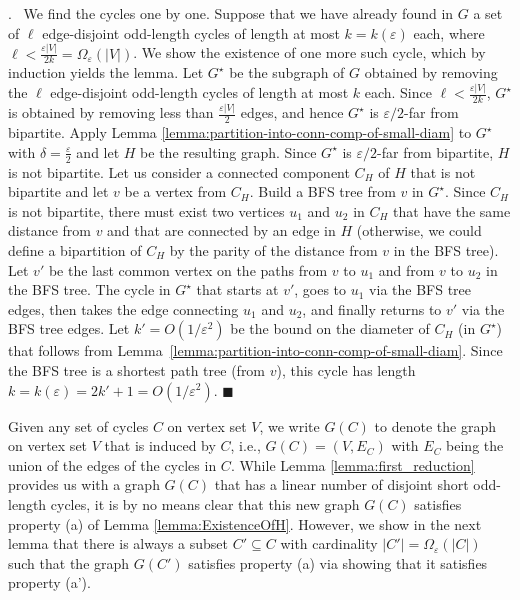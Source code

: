 \documentclass[11pt]{article}
\newenvironment{proof}{\noindent {\bf Proof}.\ }{\qed \par\vskip 4mm\par}
\newcommand{\sq}{\hbox{\rlap{$\sqcap$}$\sqcup$}}
\newcommand{\qed}{\hspace*{\fill}\sq}
\renewcommand{\qed}{\hspace*{\fill}\ensuremath{\blacksquare}}
\newcommand{\eps}{\ensuremath{\epsilon}}
\def\epsilon{\ensuremath{\varepsilon}}
\begin{document}
\begin{proof}
We find the cycles one by one. Suppose that we have already found in $G$ a set of $\ell$ edge-disjoint odd-length cycles of length at most $k=k(\eps)$ each, where $\ell < \frac{\eps |V|}{2k}=\Omega_{\eps}(|V|)$. We show the existence of one more such cycle, which by induction yields the lemma. Let $G^\star$ be the subgraph of $G$ obtained by removing the $\ell$ edge-disjoint odd-length cycles of length at most $k$ each. Since $\ell < \frac{\eps |V|}{2k}$, $G^\star$ is obtained by removing less than $\frac{\eps |V|}{2}$ edges, and hence $G^\star$ is $\eps/2$-far from bipartite. Apply Lemma \ref{lemma:partition-into-conn-comp-of-small-diam} to $G^\star$ with $\delta = \frac{\eps}{2}$ and let $H$ be the resulting graph. Since $G^\star$ is $\eps/2$-far from bipartite, $H$ is not bipartite. Let us consider a connected component $C_H$ of $H$ that is not bipartite and let $v$ be a vertex from $C_H$. Build a BFS tree from $v$ in $G^\star$. Since $C_H$ is not bipartite, there must exist two vertices $u_1$ and $u_2$ in $C_H$ that have the same distance from $v$ and that are connected by an edge in $H$ (otherwise, we could define a bipartition of $C_H$ by the parity of the distance from $v$ in the BFS tree). Let $v'$ be the last common vertex on the paths from $v$ to $u_1$ and from $v$ to $u_2$ in the BFS tree. The cycle in $G^\star$ that starts at $v'$, goes to $u_1$ via the BFS tree edges, then takes the edge connecting $u_1$ and $u_2$, and finally returns to $v'$ via the BFS tree edges. Let $k'= O(1/\eps^2)$ be the bound on the diameter of $C_H$ (in $G^\star$) that follows from Lemma~\ref{lemma:partition-into-conn-comp-of-small-diam}.
Since the BFS tree is a shortest path tree (from $v$), this cycle has length $k = k(\eps) = 2k' + 1 = O(1/\eps^2)$.
\end{proof}

Given any set of cycles $C$ on vertex set $V$, we write $G(C)$ to denote the graph on vertex set $V$ that is induced by $C$, i.e., $G(C)=(V,E_C)$ with $E_C$ being the union of the edges of the cycles in $C$. While Lemma \ref{lemma:first_reduction} provides us with a graph $G(C)$ that has a linear number of disjoint short odd-length cycles, it is by no means clear that this new graph $G(C)$ satisfies property (a) of Lemma \ref{lemma:ExistenceOfH}. However, we show in the next lemma that there is always a subset $C' \subseteq  C$ with cardinality $| C'| = \Omega_{\eps} (|C|)$ such that the graph $G(C')$ satisfies property (a) via showing that it satisfies property (a').
\end{document}
